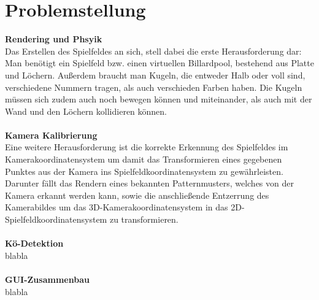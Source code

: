 
\chapter{Problemstellung}
\textbf{Rendering und Phsyik} \\
Das Erstellen des Spielfeldes an sich, stell dabei die erste Herausforderung dar: Man benötigt ein Spielfeld bzw. einen virtuellen Billardpool, bestehend aus Platte und Löchern. Außerdem braucht man Kugeln, die entweder Halb oder voll sind, verschiedene Nummern tragen, als auch verschieden Farben haben. Die Kugeln müssen sich zudem auch noch bewegen können und miteinander, als auch mit der Wand und den Löchern kollidieren können. 
\\\\\textbf{Kamera Kalibrierung}\\
Eine weitere Herausforderung ist die korrekte Erkennung des Spielfeldes im Kamerakoordinatensystem um damit das Transformieren eines gegebenen Punktes aus der Kamera ins Spielfeldkoordinatensystem zu gewährleisten. Darunter fällt das Rendern eines bekannten Patternmusters, welches von der Kamera erkannt werden kann, sowie die anschließende Entzerrung des Kamerabildes um das 3D-Kamerakoordinatensystem in das 2D-Spielfeldkoordinatensystem zu transformieren.
\\\\\textbf{Kö-Detektion} \\
blabla
\\\\\textbf{GUI-Zusammenbau} \\
blabla
